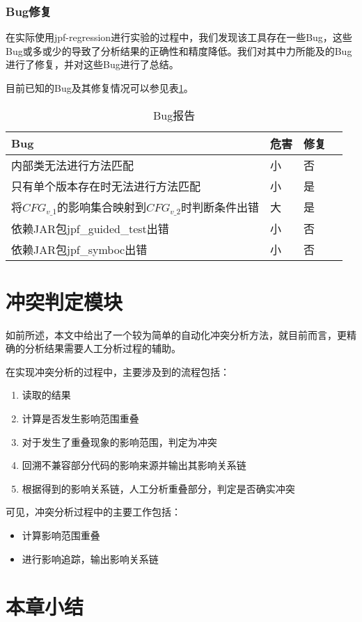 \subsubsection{Bug修复}

在实际使用jpf-regression进行实验的过程中，我们发现该工具存在一些Bug，这些Bug或多或少的导致了分析结果的正确性和精度降低。我们对其中力所能及的Bug进行了修复，并对这些Bug进行了总结。

目前已知的Bug及其修复情况可以参见表\ref {bug_data}。

\begin{table}
	\caption{Bug报告}
	\label{bug_data}
	\centering
	\begin{tabular}{lllc}
		\toprule[1.5pt]
		{\heiti Bug} &{\heiti 危害} & {\heiti 修复} \\\midrule[1pt]
		内部类无法进行方法匹配 & 小 & 否\\
		只有单个版本存在时无法进行方法匹配 & 小 & 是\\
		将$CFG_{v\_1}$的影响集合映射到$CFG_{v\_2}$时判断条件出错 & 大 & 是\\
		依赖JAR包jpf\_guided\_test出错 & 小 & 否\\
		依赖JAR包jpf\_symboc出错 & 小 & 否\\
		\bottomrule[1.5pt]
	\end{tabular}
\end{table}

\section{冲突判定模块}

如前所述，本文中给出了一个较为简单的自动化冲突分析方法，就目前而言，更精确的分析结果需要人工分析过程的辅助。

在实现冲突分析的过程中，主要涉及到的流程包括：
\begin{enumerate}
	\item 读取的结果
	\item 计算是否发生影响范围重叠
	\item 对于发生了重叠现象的影响范围，判定为冲突
	\item 回溯不兼容部分代码的影响来源并输出其影响关系链
	\item 根据得到的影响关系链，人工分析重叠部分，判定是否确实冲突
\end{enumerate}

可见，冲突分析过程中的主要工作包括：
\begin{itemize}
	\item 计算影响范围重叠
	\item 进行影响追踪，输出影响关系链
\end{itemize}

\section{本章小结}